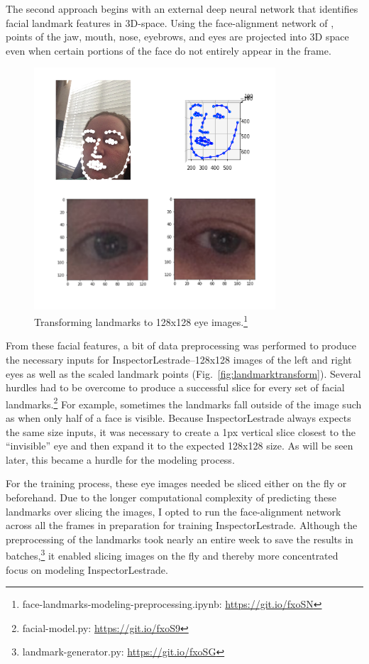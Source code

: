 \documentclass[aip, rsi, amsmath, amssymb, reprint, author-year, longbibliography]{revtex4-1}
\begin{document}
The second approach begins with an external deep neural network that identifies
facial landmark features in 3D-space. Using the face-alignment network of
\cite{bulat2017far}, points of the jaw, mouth, nose, eyebrows, and eyes are
projected into 3D space even when certain portions of the face do not entirely
appear in the frame.

\begin{figure}[b]
  \includegraphics[height=9cm]{landmarks-to-eyes.png}
  \caption{\label{fig:landmarktransform} Transforming landmarks to 128x128 eye
    images.\footnote{\label{ftn:preprocessing}face-landmarks-modeling-preprocessing.ipynb:
      \url{https://git.io/fxoSN}}}
\end{figure}

From these facial features, a bit of data preprocessing was performed to produce
the necessary inputs for InspectorLestrade--128x128 images of the left and right
eyes as well as the scaled landmark points (Fig.~\ref{fig:landmarktransform}).
Several hurdles had to be overcome to produce a successful slice for every set
of facial landmarks.\footnote{facial-model.py: \url{https://git.io/fxoS9}} For
example, sometimes the landmarks fall outside of the image such as when only
half of a face is visible. Because InspectorLestrade always expects the same
size inputs, it was necessary to create a 1px vertical slice closest to the
``invisible'' eye and then expand it to the expected 128x128 size. As will be
seen later, this became a hurdle for the modeling process.

For the training process, these eye images needed be sliced either on the fly or
beforehand. Due to the longer computational complexity of predicting these
landmarks over slicing the images, I opted to run the face-alignment network
across all the frames in preparation for training InspectorLestrade. Although
the preprocessing of the landmarks took nearly an entire week to save the
results in batches,\footnote{landmark-generator.py: \url{https://git.io/fxoSG}} it
enabled slicing images on the fly and thereby more concentrated focus on
modeling InspectorLestrade.
\end{document}
